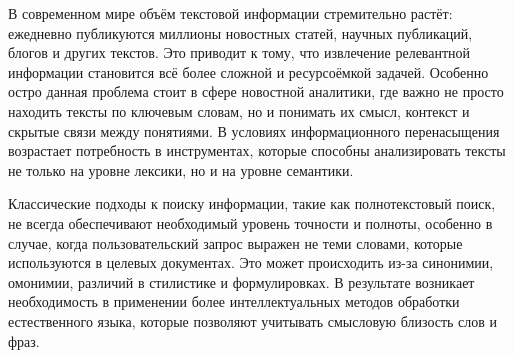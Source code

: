 \documentclass[coursework]{SCWorks}
\begin{document}

\date{2025}

\maketitle

\secNumbering

\tableofcontents




\intro
В современном мире объём текстовой информации стремительно растёт: ежедневно публикуются миллионы новостных статей, научных публикаций, блогов и других текстов. Это приводит к тому, что извлечение релевантной информации становится всё более сложной и ресурсоёмкой задачей. Особенно остро данная проблема стоит в сфере новостной аналитики, где важно не просто находить тексты по ключевым словам, но и понимать их смысл, контекст и скрытые связи между понятиями. В условиях информационного перенасыщения возрастает потребность в инструментах, которые способны анализировать тексты не только на уровне лексики, но и на уровне семантики.

Классические подходы к поиску информации, такие как полнотекстовый поиск, не всегда обеспечивают необходимый уровень точности и полноты, особенно в случае, когда пользовательский запрос выражен не теми словами, которые используются в целевых документах. Это может происходить из-за синонимии, омонимии, различий в стилистике и формулировках. В результате возникает необходимость в применении более интеллектуальных методов обработки естественного языка, которые позволяют учитывать смысловую близость слов и фраз.
\end{document}
